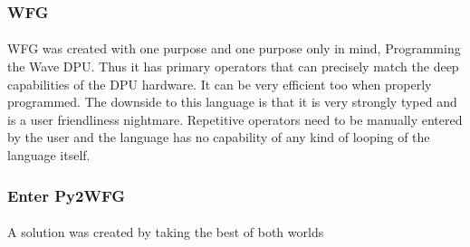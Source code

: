 \subsubsection*{WFG}
\paragraph{}
WFG was created with one purpose and one purpose only in mind, Programming the Wave DPU. Thus it has primary operators that can precisely match the deep capabilities of the DPU hardware. It can be very efficient too when properly programmed. The downside to this language is that it is very strongly typed and is a user friendliness nightmare. Repetitive operators need to be manually entered by the user and the language has no capability of any kind of looping of the language itself.

\subsubsection{Enter Py2WFG}
\paragraph{}
A solution was created by taking the best of both worlds
 